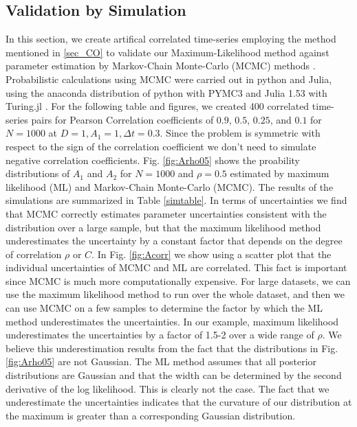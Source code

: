 \documentclass[%
 reprint,
 amsmath,amssymb,
 aps,
]{revtex4-1}
\begin{document}
\subsection{Validation by Simulation}
In this section, we create artifical correlated time-series employing the method mentioned in \ref{sec_CO} to validate our Maximum-Likelihood method against parameter estimation by Markov-Chain Monte-Carlo (MCMC) methods \cite{RN46}.  Probabilistic calculations using MCMC were carried out in python and Julia, using the anaconda distribution of python \cite{anaconda} with PYMC3 \cite{RN75} and Julia 1.53 \cite{bezanson2017julia} with Turing.jl \cite{ge2018t}.  For the following table and figures, we created 400 correlated time-series pairs for Pearson Correlation coefficients of $0.9$, $0.5$, $0.25$, and $0.1$ for $N=1000$ at $D=1,A_{1}=1,\Delta t = 0.3$.  Since the problem is symmetric with respect to the sign of the correlation coefficient we don't need to simulate negative correlation coefficients. Fig. \ref{fig:Arho05} shows the proability distributions of $A_1$ and $A_2$ for $N=1000$ and $\rho=0.5$ estimated by maximum likelihood (ML) and Markov-Chain Monte-Carlo (MCMC). The results of the simulations are summarized in Table \ref{simtable}.  In terms of uncertainties we find that MCMC correctly estimates parameter uncertainties consistent with the distribution over a large sample, but that the maximum likelihood method underestimates the uncertainty by a constant factor that depends on the degree of correlation $\rho$ or $C$. In Fig. \ref{fig:Acorr} we show using a scatter plot that the individual uncertainties of MCMC and ML are correlated.  This fact is important since MCMC is much more computationally expensive.  For large datasets, we can use the maximum likelihood method to run over the whole dataset, and then we can use MCMC on a few samples to determine the factor by which the ML method underestimates the uncertainties.  In our example, maximum likelihood underestimates the uncertainties by a factor of 1.5-2 over a wide range of $\rho$.  We believe this underestimation results from the fact that the distributions in Fig. \ref{fig:Arho05} are not Gaussian.  The ML method assumes that all posterior distributions are Gaussian and that the width can be determined by the second derivative of the log likelihood.  This is clearly not the case.  The fact that we underestimate the uncertainties indicates that the curvature of our distribution at the maximum is greater than a corresponding Gaussian distribution.
\end{document}

